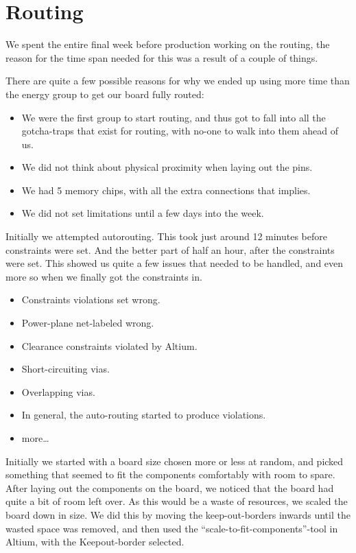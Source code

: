 \section {Routing}

We spent the entire final week before production working on the routing,
the reason for the time span needed for this was a result of a couple of
things.

There are quite a few possible reasons for why we ended up using more time than
the energy group to get our board fully routed:
\begin {itemize}
\item We were the first group to start routing, and thus got to fall into all
  the gotcha-traps that exist for routing, with no-one to walk into them ahead
  of us.
\item We did not think about physical proximity when laying out the pins.
\item We had 5 memory chips, with all the extra connections that implies.
\item We did not set limitations until a few days into the week.
\end {itemize}

Initially we attempted autorouting. This took just around 12 minutes before
constraints were set. And the better part of half an hour, after the constraints were set. 
This showed us quite a few issues that needed to be handled, and even more so when we 
finally got the constraints in.

\begin{itemize}
\item Constraints violations set wrong.
\item Power-plane net-labeled wrong.
\item Clearance constraints violated by Altium.
\item Short-circuiting vias.
\item Overlapping vias.
\item In general, the auto-routing started to produce violations.
\item more\ldots
\end{itemize}

Initially we started with a board size chosen more or less at random, and picked
something that seemed to fit the components comfortably with room to spare.
After laying out the components on the board, we noticed that the board had
quite a bit of room left over. As this would be a waste of resources, we scaled
the board down in size. We did this by moving the keep-out-borders inwards until
the wasted space was removed, and then used the ``scale-to-fit-components''-tool
in Altium, with the Keepout-border selected.

